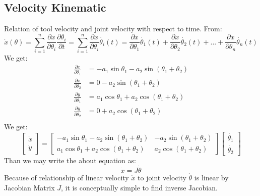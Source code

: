 \subsection{Velocity Kinematic}
Relation of tool velocity and joint velocity with respect to time. From:
\begin{equation}\label{key}
	\dot{x}(\theta) = \sum_{i=1}^{n} \frac{\partial x}{\partial \theta_i} \frac{\partial \theta_i}{\partial t} = \sum_{i=1}^{n} \frac{\partial x}{\partial \theta_i} \dot{\theta_i}(t) = \frac{\partial x}{\partial \theta_1}\dot{\theta_1}(t) + \frac{\partial x}{\partial \theta_2}\dot{\theta_2}(t) + ... + \frac{\partial x}{\partial \theta_n}\dot{\theta_n}(t)
\end{equation}
We get:
\begin{equation}
	\begin{split}
		\frac{\partial x}{\partial \theta_1} &= -a_1 \sin \theta_1 - a_2 \sin(\theta_1+\theta_2) \\
		\frac{\partial x}{\partial \theta_2} &= 0 - a_2 \sin(\theta_1+\theta_2) \\
		\frac{\partial y}{\partial \theta_1} &= a_1 \cos \theta_1 + a_2 \cos(\theta_1+\theta_2) \\
		\frac{\partial y}{\partial \theta_2} &= 0 + a_2 \cos(\theta_1+\theta_2) \\
	\end{split}
\end{equation}
We get:
\begin{equation}
	\begin{bmatrix}
		\dot{x} \\
		\dot{y} 
	\end{bmatrix}=
	\begin{bmatrix}
		-a_1 \sin \theta_1 - a_2 \sin(\theta_1+\theta_2) & - a_2 \sin(\theta_1+\theta_2) \\
		a_1 \cos \theta_1 + a_2 \cos(\theta_1+\theta_2) & a_2 \cos(\theta_1+\theta_2)
	\end{bmatrix}
	\begin{bmatrix}
		\dot{\theta_1} \\
		\dot{\theta_2} 
	\end{bmatrix}
\end{equation}
Than we may write the about equation as:
\begin{equation}
	\dot{x} = J\dot{\theta}
\end{equation}
Because of relationship of linear velocity $\dot{x}$ to joint velocity $\dot{\theta}$ is linear by Jacobian Matrix $J$, it is conceptually simple to find inverse Jacobian.
